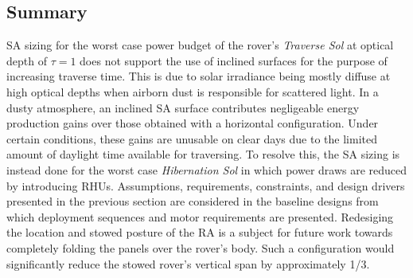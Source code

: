 \subsection{Summary}
\ac{SA} sizing for the worst case power budget of the rover's \textit{Traverse Sol} at optical depth of $\tau = 1$ does not support the use of inclined surfaces for the purpose of increasing traverse time. This is due to solar irradiance being mostly diffuse at high optical depths when airborn dust is responsible for scattered light. In a dusty atmosphere, an inclined \ac{SA} surface contributes negligeable energy production gains over those obtained with a horizontal configuration. Under certain conditions, these gains are unusable on clear days due to the limited amount of daylight time available for traversing. To resolve this, the \ac{SA} sizing is instead done for the worst case \textit{Hibernation Sol} in which power draws are reduced by introducing \acp{RHU}. Assumptions, requirements, constraints, and design drivers presented in the previous section are considered in the baseline designs from which deployment sequences and motor requirements are presented. Redesiging the location and stowed posture of the \ac{RA} is a subject for future work towards completely folding the panels over the rover's body. Such a configuration would significantly reduce the stowed rover's vertical span by approximately 1/3.
